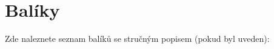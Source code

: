 \section{Balíky}
Zde naleznete seznam balíků se stručným popisem (pokud byl uveden)\+:\begin{DoxyCompactList}
\item{}
\end{DoxyCompactList}
